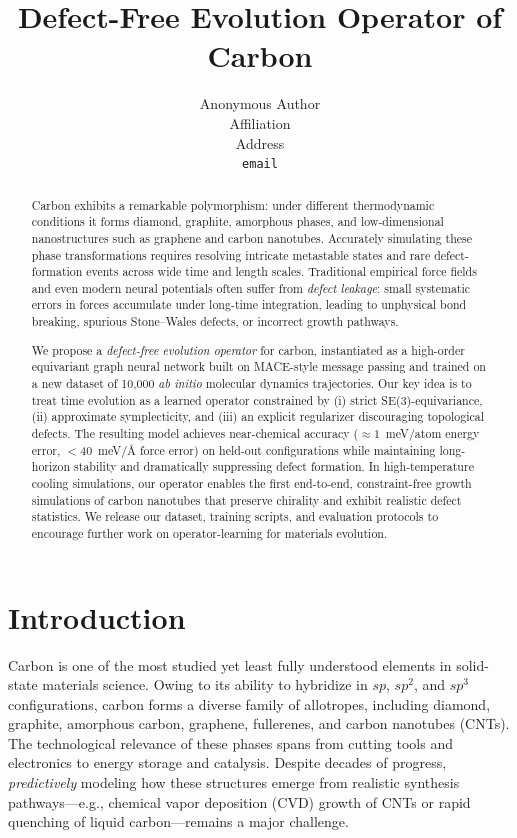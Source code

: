 \documentclass{article}
\title{Defect-Free Evolution Operator of Carbon}
\author{%
  Anonymous Author \\
  Affiliation \\
  Address \\
  \texttt{email} \\
}
\date{}
\begin{document}
\maketitle

\begin{abstract}
Carbon exhibits a remarkable polymorphism: under different thermodynamic conditions it forms diamond, graphite, amorphous phases, and low-dimensional nanostructures such as graphene and carbon nanotubes. Accurately simulating these phase transformations requires resolving intricate metastable states and rare defect-formation events across wide time and length scales. Traditional empirical force fields and even modern neural potentials often suffer from \emph{defect leakage}: small systematic errors in forces accumulate under long-time integration, leading to unphysical bond breaking, spurious Stone--Wales defects, or incorrect growth pathways. 

We propose a \emph{defect-free evolution operator} for carbon, instantiated as a high-order equivariant graph neural network built on MACE-style message passing and trained on a new dataset of 10{,}000 \emph{ab initio} molecular dynamics trajectories. Our key idea is to treat time evolution as a learned operator constrained by (i) strict SE(3)-equivariance, (ii) approximate symplecticity, and (iii) an explicit regularizer discouraging topological defects. The resulting model achieves near-chemical accuracy ($\approx 1$~meV/atom energy error, $<$40~meV/\AA{} force error) on held-out configurations while maintaining long-horizon stability and dramatically suppressing defect formation. In high-temperature cooling simulations, our operator enables the first end-to-end, constraint-free growth simulations of carbon nanotubes that preserve chirality and exhibit realistic defect statistics. We release our dataset, training scripts, and evaluation protocols to encourage further work on operator-learning for materials evolution.
\end{abstract}

\section{Introduction}
\label{sec:intro}

Carbon is one of the most studied yet least fully understood elements in solid-state materials science. Owing to its ability to hybridize in \mbox{$sp$}, \mbox{$sp^2$}, and \mbox{$sp^3$} configurations, carbon forms a diverse family of allotropes, including diamond, graphite, amorphous carbon, graphene, fullerenes, and carbon nanotubes (CNTs). The technological relevance of these phases spans from cutting tools and electronics to energy storage and catalysis. Despite decades of progress, \emph{predictively} modeling how these structures emerge from realistic synthesis pathways---e.g., chemical vapor deposition (CVD) growth of CNTs or rapid quenching of liquid carbon---remains a major challenge.
\end{document}
